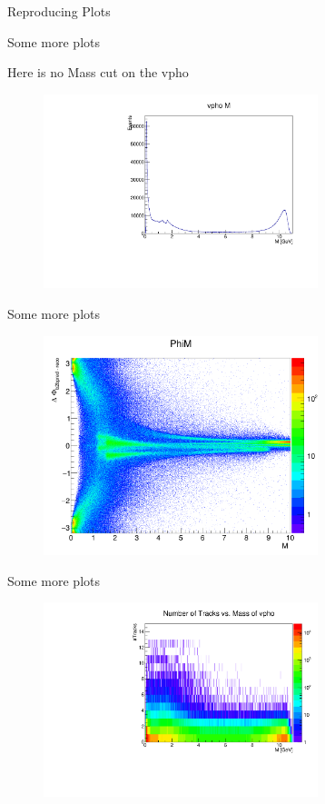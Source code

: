 \documentclass[10pt]{beamer}
\begin{document}
{\begin{frame}{Reproducing Plots}
\begin{figure}
\begin{subfigure}{.5\textwidth}
		\label{fig:sub2}
	\end{subfigure}

	\label{fig:test}
\end{figure}

\end{frame}


\begin{frame}{Some more plots}

Here is no Mass cut on the vpho

	
	\begin{figure}
		\includegraphics[width=8cm]{Plots/vphoM.pdf}
	\end{figure}
	
	
\end{frame}



\begin{frame}{Some more plots}
	
	\begin{figure}
		\includegraphics[width=8cm]{Plots/PhiM.png}
	\end{figure}
	
	
\end{frame}

\begin{frame}{Some more plots}
	
	\begin{figure}
		\includegraphics[width=8cm]{Plots/nTrM}
	\end{figure}
	

\end{frame}}
\end{document}
